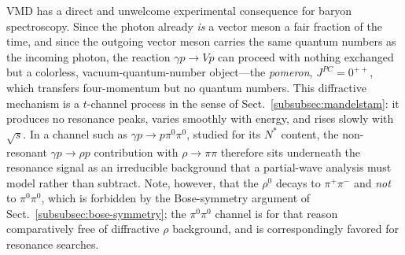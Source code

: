 VMD has a direct and unwelcome experimental consequence for baryon spectroscopy. Since
the photon already \emph{is} a vector meson a fair fraction of the time, and since the
outgoing vector meson carries the same quantum numbers as the incoming photon, the
reaction $\gamma p \to V p$ can proceed with nothing exchanged but a colorless,
vacuum-quantum-number object---the \emph{pomeron}, $J^{PC}=0^{++}$, which transfers
four-momentum but no quantum numbers. This diffractive mechanism is a $t$-channel process
in the sense of Sect.~\ref{subsubsec:mandelstam}: it produces no resonance peaks, varies
smoothly with energy, and rises slowly with $\sqrt{s}$. In a channel such as
$\gamma p \to p\pi^{0}\pi^{0}$, studied for its $N^{*}$ content, the non-resonant
$\gamma p \to \rho p$ contribution with $\rho\to\pi\pi$ therefore sits underneath the
resonance signal as an irreducible background that a partial-wave analysis must model
rather than subtract. Note, however, that the $\rho^{0}$ decays to $\pi^{+}\pi^{-}$ and
\emph{not} to $\pi^{0}\pi^{0}$, which is forbidden by the Bose-symmetry argument of
Sect.~\ref{subsubsec:bose-symmetry}; the $\pi^{0}\pi^{0}$ channel is for that reason
comparatively free of diffractive $\rho$ background, and is correspondingly favored for
resonance searches.

\FloatBarrier
